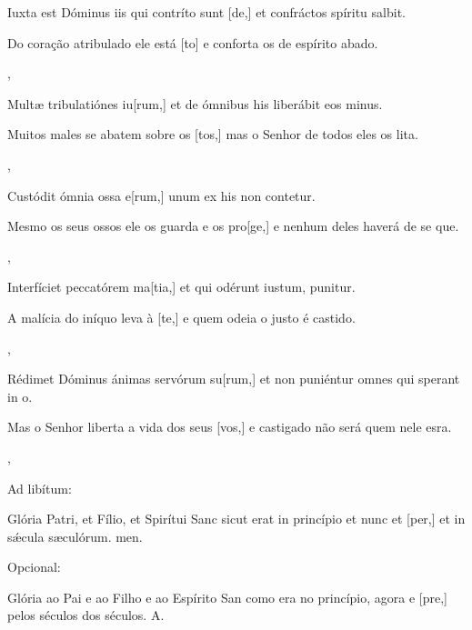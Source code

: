 {  {\item {}Iuxta est Dóminus iis qui contríto sunt [de,] et confráctos spíritu salbit.~\Responsorium}%
    {\item {}Do coração atribulado ele está [to] e conforta os de espírito abado.~\Responsorium},
  {\item {}Multæ tribulatiónes iu[rum,] et de ómnibus his liberábit eos minus.~\Responsorium}%
    {\item {}Muitos males se abatem sobre os [tos,] mas o Senhor de todos eles os lita.~\Responsorium},
  {\item {}Custódit ómnia ossa e[rum,] unum ex his non contetur.~\Responsorium}%
    {\item {}Mesmo os seus ossos ele os guarda e os pro[ge,] e nenhum deles haverá de se que.~\Responsorium},
  {\item {}Interfíciet peccatórem ma[tia,] et qui odérunt iustum, puni\-tur.~\Responsorium}%
    {\item {}A malícia do iníquo leva à [te,] e quem odeia o justo é castido.~\Responsorium},
  {\item {}Rédimet Dóminus ánimas servórum su[rum,] et non puniéntur omnes qui sperant in o.~\Responsorium}%
    {\item {}Mas o Senhor liberta a vida dos seus [vos,] e castigado não será quem nele esra.~\Responsorium},
  {\item[] \begin{rubrica}Ad libítum:\end{rubrica} Glória Patri, et Fílio, et Spirítui Sanc sicut erat in princípio et nunc et [per,] et in sǽcula sæculórum. men.~\Responsorium}%
    {\item[] \begin{rubrica}Opcional:\end{rubrica} Glória ao Pai e ao Filho e ao Espírito San como era no princípio, agora e [pre,] pelos séculos dos séculos. A.}
}